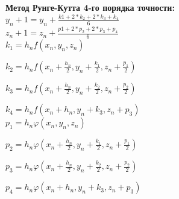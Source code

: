     \hspace{0cm} \textbf{Метод Рунге-Кутта 4-го порядка точности:} \\
    
    $y_n+1 = y_n + \frac{k1 + 2 * k_2 + 2 * k_3 + k_4}{6}$ \\
    
    $z_n+1 = z_n + \frac{p1 + 2 * p_2 + 2 * p_3 + p_4}{6}$ \\
    
    $k_1 = h_nf(x_n, y_n, z_n)$ \
    
    $k_2 = h_nf(x_n + \frac{h_n}{2}, y_n + \frac{k_1}{2}, z_n + \frac{p_1}{2})$ \
    
    $k_3 = h_nf(x_n + \frac{h_n}{2}, y_n + \frac{k_2}{2}, z_n + \frac{p_2}{2})$ \
    
    $k_4 = h_nf(x_n + h_n, y_n + k_3, z_n + p_3)$ \\
    
    $p_1 = h_n\varphi(x_n, y_n, z_n)$ \
    
    $p_2 = h_n\varphi(x_n + \frac{h_n}{2}, y_n + \frac{k_1}{2}, z_n + \frac{p_1}{2})$ \
    
    $p_3 = h_n\varphi(x_n + \frac{h_n}{2}, y_n + \frac{k_2}{2}, z_n + \frac{p_2}{2})$ \
    
    $p_4 = h_n\varphi(x_n + h_n, y_n + k_3, z_n + p_3)$ \\
    
    
    